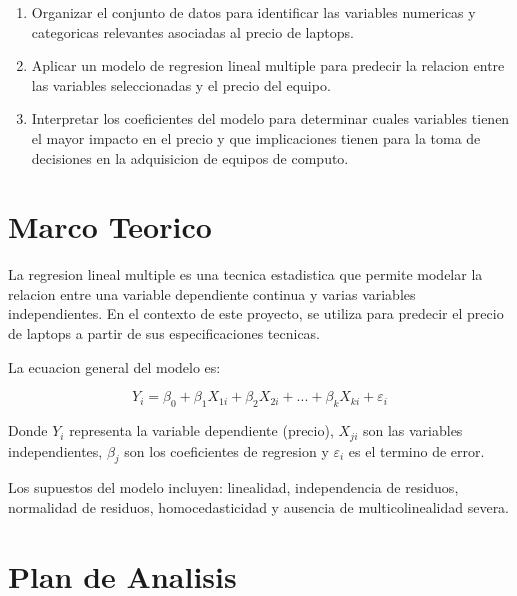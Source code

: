 \documentclass[12pt,a4paper]{article}
\begin{document}
\begin{enumerate}[leftmargin=2cm]
    \item Organizar el conjunto de datos para identificar las variables numericas y categoricas relevantes asociadas al precio de laptops.
    
    \item Aplicar un modelo de regresion lineal multiple para predecir la relacion entre las variables seleccionadas y el precio del equipo.
    
    \item Interpretar los coeficientes del modelo para determinar cuales variables tienen el mayor impacto en el precio y que implicaciones tienen para la toma de decisiones en la adquisicion de equipos de computo.
\end{enumerate}

\section{Marco Teorico}

La regresion lineal multiple es una tecnica estadistica que permite modelar la relacion entre una variable dependiente continua y varias variables independientes. En el contexto de este proyecto, se utiliza para predecir el precio de laptops a partir de sus especificaciones tecnicas.

La ecuacion general del modelo es:

\begin{equation}
    Y_i = \beta_0 + \beta_1 X_{1i} + \beta_2 X_{2i} + ... + \beta_k X_{ki} + \varepsilon_i
\end{equation}

Donde $Y_i$ representa la variable dependiente (precio), $X_{ji}$ son las variables independientes, $\beta_j$ son los coeficientes de regresion y $\varepsilon_i$ es el termino de error.

Los supuestos del modelo incluyen: linealidad, independencia de residuos, normalidad de residuos, homocedasticidad y ausencia de multicolinealidad severa.

\section{Plan de Analisis}
\end{document}
